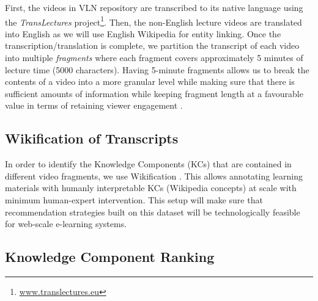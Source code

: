 \documentclass[letterpaper]{article} %
\begin{document}
First, the videos in VLN repository are transcribed to its native language using the \emph{TransLectures} project\footnote{\url{www.translectures.eu}}. Then, the non-English lecture videos are translated into English as we will use English Wikipedia for entity linking.
Once the transcription/translation is complete, we partition the transcript of each video into multiple \emph{fragments} where each fragment covers approximately 5 minutes of lecture time (5000 characters).
Having 5-minute fragments allows us to break the contents of a video into a more granular level while making sure that there is sufficient amounts of information while keeping fragment length at a favourable value in terms of retaining viewer engagement \cite{Guo_vid_prod}.

\subsection{Wikification of Transcripts}
In order to identify the Knowledge Components (KCs) that are contained in different video fragments, we use Wikification \cite{wikifier}. This allows annotating learning materials with humanly interpretable KCs (Wikipedia concepts) at scale with minimum human-expert intervention. This setup will make sure that recommendation strategies built on this dataset will be technologically feasible for web-scale e-learning systems. 


\subsection{Knowledge Component Ranking}
\end{document}
